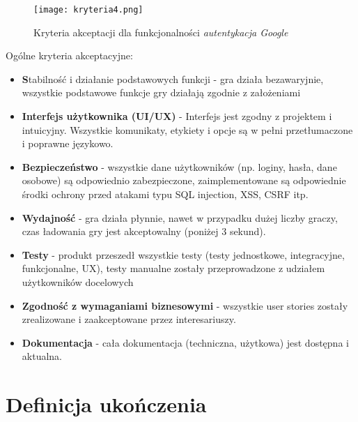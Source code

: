 \documentclass[12pt,a4paper,colorlinks=true,linkcolor=NavyBlue,citecolor=red,urlcolor=NavyBlue]{book}
\begin{document}
\begin{figure}[h!]
    \centering
    \vspace{1cm}
    \texttt{[image: kryteria4.png]}
    \caption{Kryteria akceptacji dla funkcjonalności \textit{autentykacja Google}}
    \vspace{0.5cm}
\end{figure}


\vspace{1cm}
{\large Ogólne kryteria akceptacyjne:}
\begin{itemize}
\item \textbf Stabilność i działanie podstawowych funkcji - gra działa bezawaryjnie, wszystkie podstawowe funkcje gry działają zgodnie z założeniami

\item \textbf{Interfejs użytkownika (UI/UX)} - Interfejs jest zgodny z projektem i intuicyjny.
Wszystkie komunikaty, etykiety i opcje są w pełni przetłumaczone i poprawne językowo.

\item \textbf{Bezpieczeństwo} - wszystkie dane użytkowników (np. loginy, hasła, dane osobowe) są odpowiednio zabezpieczone, zaimplementowane są odpowiednie środki ochrony przed atakami typu SQL injection, XSS, CSRF itp.

\item \textbf{Wydajność} - gra działa płynnie, nawet w przypadku dużej liczby graczy, czas ładowania gry jest akceptowalny (poniżej 3 sekund).

\item \textbf{Testy} - produkt przeszedł wszystkie testy (testy jednostkowe, integracyjne, funkcjonalne, UX), testy manualne zostały przeprowadzone z udziałem użytkowników docelowych

\item \textbf{Zgodność z wymaganiami biznesowymi} - wszystkie user stories zostały zrealizowane i zaakceptowane przez interesariuszy.

\item \textbf{Dokumentacja} - cała dokumentacja (techniczna, użytkowa) jest dostępna i aktualna.
\end{itemize}
\vspace{0.5cm}

\newpage
\section{Definicja ukończenia}
\end{document}
